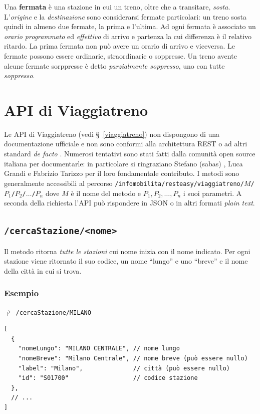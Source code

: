 \documentclass[12pt,italian]{report}
\begin{document}
Una \textbf{fermata} è una stazione in cui un treno, oltre che a
transitare, \textit{sosta}.  L'\textit{origine} e la
\textit{destinazione} sono considerarsi fermate particolari: un treno
sosta quindi in almeno due fermate, la prima e l'ultima.  Ad ogni
fermata è associato un \textit{orario programmato} ed
\textit{effettivo} di arrivo e partenza la cui differenza è il
relativo ritardo.  La prima fermata non può avere un orario di arrivo
e viceversa.  Le fermate possono essere ordinarie, straordinarie o
soppresse.  Un treno avente alcune fermate sorppresse è detto
\textit{parzialmente soppresso}, uno con tutte \textit{soppresso}.

\section{API di Viaggiatreno}

Le API di Viaggiatreno (vedi \S~\ref{viaggiatreno}) non dispongono di
una documentazione ufficiale e non sono conformi alla architettura
REST o ad altri standard \textit{de facto} \cite{Giunta}.  Numerosi
tentativi sono stati fatti dalla comunità open source italiana per
documentarle: in particolare si ringraziano Stefano (sabas)
\cite{Sabas}, Luca Grandi \cite{Grandi} e Fabrizio Tarizzo
\cite{Tarizzo} per il loro fondamentale contributo.  I metodi sono
generalmente accessibili al percorso
\texttt{/infomobilita/\-resteasy/\-viaggiatreno/\-$M$/\-$P_1$/\-$P_2$/\-$\dots$/\-$P_n$}
dove $M$ è il nome del metodo e $P_1, P_2, \dots, P_n$ i suoi
parametri. A seconda della richiesta l'API può rispondere in JSON o in
altri formati \textit{plain text}.


\subsection{\texttt{/cercaStazione/<nome>}}
\label{cercaStazione}

Il metodo ritorna \textit{tutte le stazioni} cui nome inizia con il
nome indicato.  Per ogni stazione viene ritornato il suo codice, un
nome ``lungo'' e uno ``breve'' e il nome della città in cui si trova.

\subsubsection{Esempio}

$\Rsh$ \texttt{/cercaStazione/MILANO}
\begin{verbatim}
[
  {
    "nomeLungo": "MILANO CENTRALE", // nome lungo
    "nomeBreve": "Milano Centrale", // nome breve (può essere nullo)
    "label": "Milano",              // città (può essere nullo)
    "id": "S01700"                  // codice stazione
  },
  // ...
]
\end{verbatim}
\end{document}
